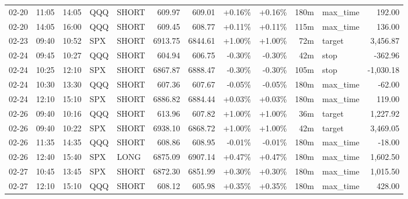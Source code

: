 \documentclass[11pt,a4paper,twoside]{article}
\begin{document}
\begin{center}
\begin{longtable}{>{\color{txtmain}}l l l l l r r r r r >{\color{txtmain}}l r}
02-20 & 11:05 & 14:05 & QQQ & SHORT & 609.97 & 609.01 & \textcolor{wingreen}{+0.16\%} & \textcolor{wingreen}{+0.16\%} & 180m & max\_time & \textcolor{wingreen}{192.00} \\
02-20 & 14:05 & 16:00 & QQQ & SHORT & 609.45 & 608.77 & \textcolor{wingreen}{+0.11\%} & \textcolor{wingreen}{+0.11\%} & 115m & max\_time & \textcolor{wingreen}{136.00} \\
02-23 & 09:40 & 10:52 & SPX & SHORT & 6913.75 & 6844.61 & \textcolor{wingreen}{+1.00\%} & \textcolor{wingreen}{+1.00\%} & 72m & target & \textcolor{wingreen}{3,456.87} \\
02-24 & 09:45 & 10:27 & QQQ & SHORT & 604.94 & 606.75 & \textcolor{lossred}{-0.30\%} & \textcolor{lossred}{-0.30\%} & 42m & stop & \textcolor{lossred}{-362.96} \\
02-24 & 10:25 & 12:10 & SPX & SHORT & 6867.87 & 6888.47 & \textcolor{lossred}{-0.30\%} & \textcolor{lossred}{-0.30\%} & 105m & stop & \textcolor{lossred}{-1,030.18} \\
02-24 & 10:30 & 13:30 & QQQ & SHORT & 607.36 & 607.67 & \textcolor{lossred}{-0.05\%} & \textcolor{lossred}{-0.05\%} & 180m & max\_time & \textcolor{lossred}{-62.00} \\
02-24 & 12:10 & 15:10 & SPX & SHORT & 6886.82 & 6884.44 & \textcolor{wingreen}{+0.03\%} & \textcolor{wingreen}{+0.03\%} & 180m & max\_time & \textcolor{wingreen}{119.00} \\
02-26 & 09:40 & 10:16 & QQQ & SHORT & 613.96 & 607.82 & \textcolor{wingreen}{+1.00\%} & \textcolor{wingreen}{+1.00\%} & 36m & target & \textcolor{wingreen}{1,227.92} \\
02-26 & 09:40 & 10:22 & SPX & SHORT & 6938.10 & 6868.72 & \textcolor{wingreen}{+1.00\%} & \textcolor{wingreen}{+1.00\%} & 42m & target & \textcolor{wingreen}{3,469.05} \\
02-26 & 11:35 & 14:35 & QQQ & SHORT & 608.86 & 608.95 & \textcolor{lossred}{-0.01\%} & \textcolor{lossred}{-0.01\%} & 180m & max\_time & \textcolor{lossred}{-18.00} \\
02-26 & 12:40 & 15:40 & SPX & LONG & 6875.09 & 6907.14 & \textcolor{wingreen}{+0.47\%} & \textcolor{wingreen}{+0.47\%} & 180m & max\_time & \textcolor{wingreen}{1,602.50} \\
02-27 & 10:45 & 13:45 & SPX & SHORT & 6872.30 & 6851.99 & \textcolor{wingreen}{+0.30\%} & \textcolor{wingreen}{+0.30\%} & 180m & max\_time & \textcolor{wingreen}{1,015.50} \\
02-27 & 12:10 & 15:10 & QQQ & SHORT & 608.12 & 605.98 & \textcolor{wingreen}{+0.35\%} & \textcolor{wingreen}{+0.35\%} & 180m & max\_time & \textcolor{wingreen}{428.00} \\

\end{longtable}
\end{center}
\end{document}
